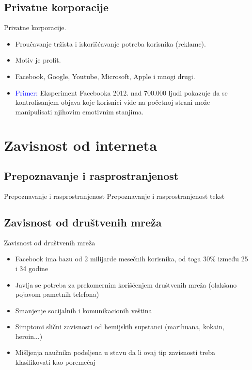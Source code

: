 \documentclass{beamer}
\begin{document}
			\subsection*{Privatne korporacije}
			\begin{frame}{Privatne korporacije.}
			\begin{itemize}
				\item Proučavanje tržista i iskorišćavanje potreba korisnika (reklame).
				\item Motiv je profit.
				\item Facebook, Google, Youtube, Microsoft, Apple i mnogi drugi.
				\item \textcolor{blue}{Primer:} Eksperiment Facebooka 2012. nad 700.000 ljudi pokazuje da se kontrolisanjem objava koje korisnici vide na početnoj strani može manipulisati njihovim emotivnim stanjima.
			 \end{itemize}
			\end{frame}		
		
	\section{Zavisnost od interneta}
		\subsection*{Prepoznavanje i rasprostranjenost}
		\begin{frame}{Prepoznavanje i rasprostranjenost}
				Prepoznavanje i rasprostranjenost tekst
		\end{frame}
	
		\subsection*{Zavisnost od društvenih mreža}
			\begin{frame}{Zavisnost od društvenih mreža}
				\begin{itemize}
				\item Facebook ima bazu od 2 milijarde mesečnih korisnika, od toga 30\% između 25 i 34 godine
				\item Javlja se potreba za prekomernim korišćenjem društvenih mreža (olakšano pojavom pametnih telefona)
				\item Smanjenje socijalnih i komunikacionih veština
				\item Simptomi slični zavisnosti od hemijskih supstanci (marihuana, kokain, heroin...)
				\item Mišljenja naučnika podeljena u stavu da li ovaj tip zavisnosti treba klasifikovati kao poremećaj
				\end{itemize}
			\end{frame}
\end{document}
